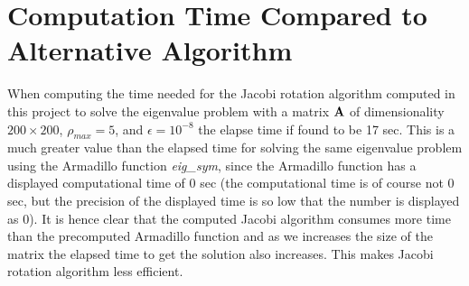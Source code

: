 \section{Computation Time Compared to Alternative Algorithm}
\label{subsec:CompTime}
When computing the time needed for the Jacobi rotation algorithm computed in this project to solve the eigenvalue problem with a matrix $\mbox{\textbf{A}}$ of dimensionality $200 \times 200$, $\rho_{max} = 5$, and $\epsilon = 10^{-8}$ the elapse time if found to be 17 sec.
This is a much greater value than the elapsed time for solving the same eigenvalue problem using the Armadillo function 
\textit{eig\_sym}, since the Armadillo function has a displayed computational time of 0 sec (the computational time is of course not 0 sec, but the precision of the displayed time is so low that the number is displayed as 0). 
It is hence clear that the computed Jacobi algorithm consumes more time than the precomputed Armadillo function and as we increases the size of the matrix the elapsed time to get the solution also increases. 
This makes Jacobi rotation algorithm less efficient.


